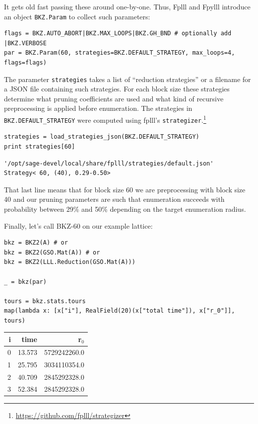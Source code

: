 \documentclass[10pt,a4paper,nobib]{tufte-handout}
\begin{document}
It gets old fast passing these around one-by-one. Thus, Fplll and Fpylll introduce an object \texttt{BKZ.Param} to collect such parameters:

\lstset{language=sage,label= ,caption= ,captionpos=b,numbers=none}
\begin{lstlisting}
flags = BKZ.AUTO_ABORT|BKZ.MAX_LOOPS|BKZ.GH_BND # optionally add |BKZ.VERBOSE
par = BKZ.Param(60, strategies=BKZ.DEFAULT_STRATEGY, max_loops=4, flags=flags)
\end{lstlisting}

The parameter \texttt{strategies} takes a list of “reduction strategies” or a filename for a JSON file containing such strategies. For each block size these strategies determine what pruning coefficients are used and what kind of recursive preprocessing is applied before enumeration. The strategies in \texttt{BKZ.DEFAULT\_STRATEGY} were computed using fplll’s \texttt{strategizer}.\footnote{\url{https://github.com/fplll/strategizer}}

\lstset{language=sage,label= ,caption= ,captionpos=b,numbers=none}
\begin{lstlisting}
strategies = load_strategies_json(BKZ.DEFAULT_STRATEGY)
print strategies[60]
\end{lstlisting}

\begin{verbatim}
'/opt/sage-devel/local/share/fplll/strategies/default.json'
Strategy< 60, (40), 0.29-0.50>
\end{verbatim}

That last line means that for block size 60 we are preprocessing with block size 40 and our pruning parameters are such that enumeration succeeds with probability between 29\% and 50\% depending on the target enumeration radius.

Finally, let’s call BKZ-60 on our example lattice:

\lstset{language=sage,label= ,caption= ,captionpos=b,numbers=none}
\begin{lstlisting}
bkz = BKZ2(A) # or
bkz = BKZ2(GSO.Mat(A)) # or 
bkz = BKZ2(LLL.Reduction(GSO.Mat(A)))

_ = bkz(par)

tours = bkz.stats.tours
map(lambda x: [x["i"], RealField(20)(x["total time"]), x["r_0"]], tours)
\end{lstlisting}

\begin{center}
\begin{tabular}{rrr}
i & time & r\(_{\text{0}}\)\\
\hline
0 & 13.573 & 5729242260.0\\
1 & 25.795 & 3034110354.0\\
2 & 40.709 & 2845292328.0\\
3 & 52.384 & 2845292328.0\\
\end{tabular}

\end{center}
\end{document}
